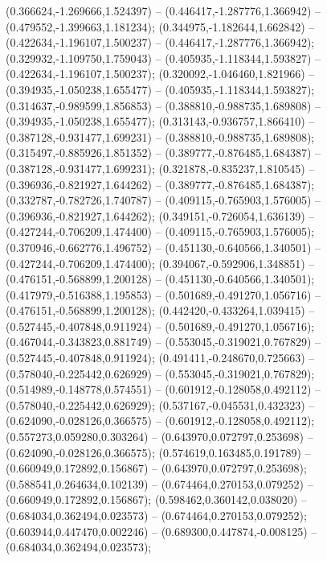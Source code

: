  (0.366624,-1.269666,1.524397) -- (0.446417,-1.287776,1.366942) -- (0.479552,-1.399663,1.181234);
 (0.344975,-1.182644,1.662842) -- (0.422634,-1.196107,1.500237) -- (0.446417,-1.287776,1.366942);
 (0.329932,-1.109750,1.759043) -- (0.405935,-1.118344,1.593827) -- (0.422634,-1.196107,1.500237);
 (0.320092,-1.046460,1.821966) -- (0.394935,-1.050238,1.655477) -- (0.405935,-1.118344,1.593827);
 (0.314637,-0.989599,1.856853) -- (0.388810,-0.988735,1.689808) -- (0.394935,-1.050238,1.655477);
 (0.313143,-0.936757,1.866410) -- (0.387128,-0.931477,1.699231) -- (0.388810,-0.988735,1.689808);
 (0.315497,-0.885926,1.851352) -- (0.389777,-0.876485,1.684387) -- (0.387128,-0.931477,1.699231);
 (0.321878,-0.835237,1.810545) -- (0.396936,-0.821927,1.644262) -- (0.389777,-0.876485,1.684387);
 (0.332787,-0.782726,1.740787) -- (0.409115,-0.765903,1.576005) -- (0.396936,-0.821927,1.644262);
 (0.349151,-0.726054,1.636139) -- (0.427244,-0.706209,1.474400) -- (0.409115,-0.765903,1.576005);
 (0.370946,-0.662776,1.496752) -- (0.451130,-0.640566,1.340501) -- (0.427244,-0.706209,1.474400);
 (0.394067,-0.592906,1.348851) -- (0.476151,-0.568899,1.200128) -- (0.451130,-0.640566,1.340501);
 (0.417979,-0.516388,1.195853) -- (0.501689,-0.491270,1.056716) -- (0.476151,-0.568899,1.200128);
 (0.442420,-0.433264,1.039415) -- (0.527445,-0.407848,0.911924) -- (0.501689,-0.491270,1.056716);
 (0.467044,-0.343823,0.881749) -- (0.553045,-0.319021,0.767829) -- (0.527445,-0.407848,0.911924);
 (0.491411,-0.248670,0.725663) -- (0.578040,-0.225442,0.626929) -- (0.553045,-0.319021,0.767829);
 (0.514989,-0.148778,0.574551) -- (0.601912,-0.128058,0.492112) -- (0.578040,-0.225442,0.626929);
 (0.537167,-0.045531,0.432323) -- (0.624090,-0.028126,0.366575) -- (0.601912,-0.128058,0.492112);
 (0.557273,0.059280,0.303264) -- (0.643970,0.072797,0.253698) -- (0.624090,-0.028126,0.366575);
 (0.574619,0.163485,0.191789) -- (0.660949,0.172892,0.156867) -- (0.643970,0.072797,0.253698);
 (0.588541,0.264634,0.102139) -- (0.674464,0.270153,0.079252) -- (0.660949,0.172892,0.156867);
 (0.598462,0.360142,0.038020) -- (0.684034,0.362494,0.023573) -- (0.674464,0.270153,0.079252);
 (0.603944,0.447470,0.002246) -- (0.689300,0.447874,-0.008125) -- (0.684034,0.362494,0.023573);
